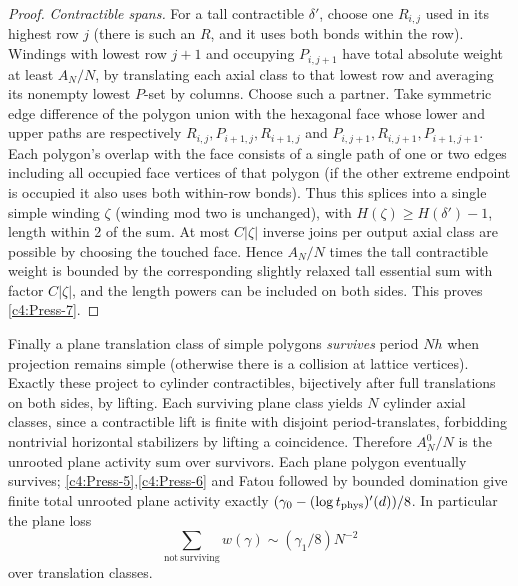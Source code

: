 \begin{proof}
\emph{Contractible spans.}
For a tall contractible \(\delta'\), choose one \(R_{i,j}\) used in its highest row \(j\) (there is such an \(R\), and it uses both bonds within the row). Windings with lowest row \(j+1\) and occupying \(P_{i,j+1}\) have total absolute weight at least \(A_N/N\), by translating each axial class to that lowest row and averaging its nonempty lowest \(P\)-set by columns. Choose such a partner. Take symmetric edge difference of the polygon union with the hexagonal face whose lower and upper paths are respectively \(R_{i,j},P_{i+1,j},R_{i+1,j}\) and \(P_{i,j+1},R_{i,j+1},P_{i+1,j+1}\). Each polygon's overlap with the face consists of a single path of one or two edges including all occupied face vertices of that polygon (if the other extreme endpoint is occupied it also uses both within-row bonds). Thus this splices into a single simple winding \(\zeta\) (winding mod two is unchanged), with \(H(\zeta)\ge H(\delta')-1\), length within 2 of the sum. At most \(C|\zeta|\) inverse joins per output axial class are possible by choosing the touched face. Hence \(A_N/N\) times the tall contractible weight is bounded by the corresponding slightly relaxed tall essential sum with factor \(C|\zeta|\), and the length powers can be included on both sides. This proves \eqref{c4:Press-7}.

\end{proof}

Finally a plane translation class of simple polygons \emph{survives} period \(Nh\) when projection remains simple (otherwise there is a collision at lattice vertices). Exactly these project to cylinder contractibles, bijectively after full translations on both sides, by lifting. Each surviving plane class yields \(N\) cylinder axial classes, since a contractible lift is finite with disjoint period-translates, forbidding nontrivial horizontal stabilizers by lifting a coincidence. Therefore \(A_N^0/N\) is the unrooted plane activity sum over survivors. Each plane polygon eventually survives; \eqref{c4:Press-5},\eqref{c4:Press-6} and Fatou followed by bounded domination give finite total unrooted plane activity exactly \((\gamma_0-(\log t_{\rm phys})'(d))/8\). In particular the plane loss
\begin{equation}
                  \sum_{\mathrm{not~surviving}} w(\gamma)
                           \sim (\gamma_1/8) N^{-2}                           \label{c4:Press-8}
\end{equation}
over translation classes.
